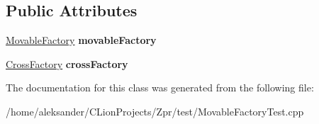 \subsection*{Public Attributes}
\begin{DoxyCompactItemize}
\item 
\hypertarget{classMovableFactoryTest_a7258af44f525ddbf48ec2e6b3276a2db}{\hyperlink{classMovableFactory}{Movable\-Factory} {\bfseries movable\-Factory}}\label{classMovableFactoryTest_a7258af44f525ddbf48ec2e6b3276a2db}

\item 
\hypertarget{classMovableFactoryTest_abc919e5227b34cfb45bfd20c7be038b0}{\hyperlink{classCrossFactory}{Cross\-Factory} {\bfseries cross\-Factory}}\label{classMovableFactoryTest_abc919e5227b34cfb45bfd20c7be038b0}

\end{DoxyCompactItemize}


The documentation for this class was generated from the following file\-:\begin{DoxyCompactItemize}
\item 
/home/aleksander/\-C\-Lion\-Projects/\-Zpr/test/Movable\-Factory\-Test.\-cpp\end{DoxyCompactItemize}

